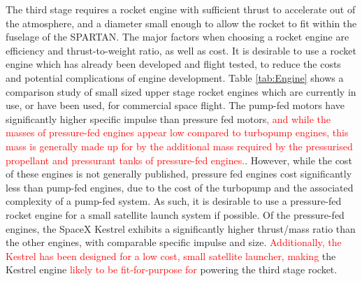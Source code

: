 The third stage requires a rocket engine with sufficient thrust to accelerate out of the atmosphere, and a diameter small enough to allow the rocket to fit within the fuselage of the SPARTAN. The major factors when choosing a rocket engine are efficiency and thrust-to-weight ratio, as well as cost. It is desirable to use a rocket engine which has already been developed and flight tested, to reduce the costs and potential complications of engine development. Table \ref{tab:Engine} shows a comparison study of small sized upper stage rocket engines which are currently in use, or have been used, for commercial space flight. The pump-fed motors have significantly higher specific impulse than pressure fed motors\textcolor{red}{, and while the masses of pressure-fed engines appear low compared to turbopump engines, this mass is generally made up for by the additional mass required by the pressurised propellant and pressurant tanks of pressure-fed engines.}. However, while the cost of these engines is not generally published, pressure fed engines cost significantly less than pump-fed engines, due to the cost of the turbopump and the associated complexity of a pump-fed system.  As such, it is desirable to use a pressure-fed rocket engine for a small satellite launch system if possible. Of the pressure-fed engines, the SpaceX Kestrel exhibits a significantly higher thrust/mass ratio than the other engines, with comparable specific impulse and size. \textcolor{red}{Additionally, the Kestrel has been designed for a low cost, small satellite launcher, making} the Kestrel engine \textcolor{red}{likely to be fit-for-purpose for} powering the third stage rocket.  
